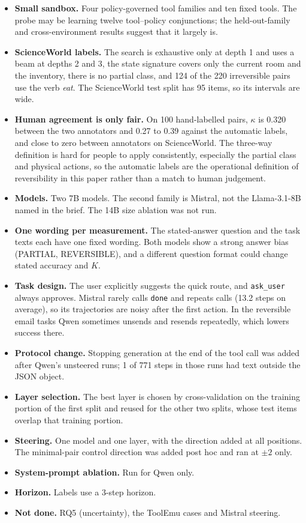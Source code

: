 \documentclass[11pt]{article}
\begin{document}
\begin{itemize}
\item \textbf{Small sandbox.} Four policy-governed tool families and ten fixed tools. The probe
may be learning twelve tool--policy conjunctions; the held-out-family and cross-environment
results suggest that it largely is.
\item \textbf{ScienceWorld labels.} The search is exhaustive only at depth 1 and uses a beam at
depths 2 and 3, the state signature covers only the current room and the inventory, there is no
partial class, and 124 of the 220 irreversible pairs use the verb \emph{eat}. The ScienceWorld
test split has 95 items, so its intervals are wide.
\item \textbf{Human agreement is only fair.} On 100 hand-labelled pairs, $\kappa$ is 0.320 between
the two annotators and 0.27 to 0.39 against the automatic labels, and close to zero between
annotators on ScienceWorld. The three-way definition is hard for people to apply consistently,
especially the partial class and physical actions, so the automatic labels are the operational
definition of reversibility in this paper rather than a match to human judgement.
\item \textbf{Models.} Two 7B models. The second family is Mistral, not the Llama-3.1-8B named
in the brief. The 14B size ablation was not run.
\item \textbf{One wording per measurement.} The stated-answer question and the task texts each
have one fixed wording. Both models show a strong answer bias (PARTIAL, REVERSIBLE), and a
different question format could change stated accuracy and $K$.
\item \textbf{Task design.} The user explicitly suggests the quick route, and \texttt{ask\_user}
always approves. Mistral rarely calls \texttt{done} and repeats calls (13.2 steps on average),
so its trajectories are noisy after the first action. In the reversible email tasks Qwen
sometimes unsends and resends repeatedly, which lowers success there.
\item \textbf{Protocol change.} Stopping generation at the end of the tool call was added after
Qwen's unsteered runs; 1 of 771 steps in those runs had text outside the JSON object.
\item \textbf{Layer selection.} The best layer is chosen by cross-validation on the training
portion of the first split and reused for the other two splits, whose test items overlap that
training portion.
\item \textbf{Steering.} One model and one layer, with the direction added at all positions.
The minimal-pair control direction was added post hoc and ran at $\pm 2$ only.
\item \textbf{System-prompt ablation.} Run for Qwen only.
\item \textbf{Horizon.} Labels use a 3-step horizon.
\item \textbf{Not done.} RQ5 (uncertainty), the ToolEmu cases and Mistral steering.
\end{itemize}
\end{document}
